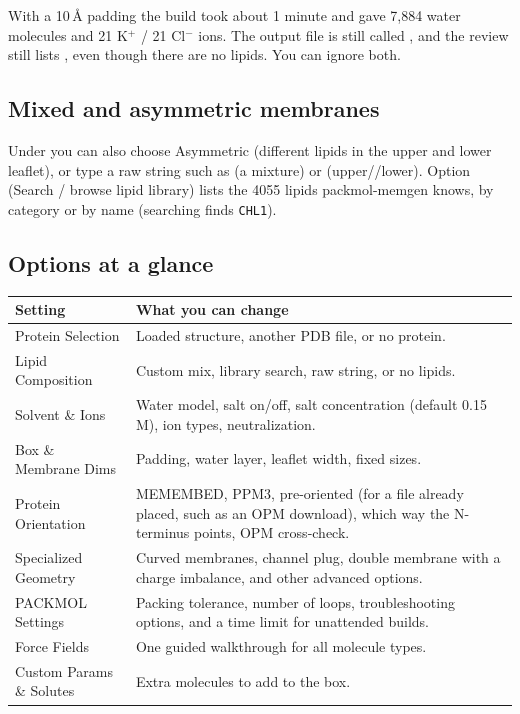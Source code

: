 With a 10\,\AA{} padding the build took about 1 minute and gave 7,884 water
molecules and 21 K$^+$ / 21 Cl$^-$ ions. The output file is still called
, and the review still lists , even
though there are no lipids. You can ignore both.

\subsection{Mixed and asymmetric membranes}

Under  you can also choose \textsf{Asymmetric} (different lipids in the
upper and lower leaflet), or type a raw string such as  (a
mixture) or  (upper//lower). Option 
(\textsf{Search / browse lipid library}) lists the 4055 lipids packmol-memgen
knows, by category or by name (searching  finds
\texttt{CHL1}).

\subsection{Options at a glance}

\begin{tabularx}{\linewidth}{@{}lL@{}}
\toprule
\textbf{Setting} & \textbf{What you can change} \\
\midrule
{} Protein Selection & Loaded structure, another PDB file, or no protein. \\
 Lipid Composition & Custom mix, library search, raw string, or no lipids. \\
 Solvent \& Ions & Water model, salt on/off, salt concentration (default
  0.15\,M), ion types, neutralization. \\
 Box \& Membrane Dims & Padding, water layer, leaflet width, fixed
  sizes. \\
 Protein Orientation & MEMEMBED, PPM3, pre-oriented (for a file
  already placed, such as an OPM download), which way the N-terminus points,
  OPM cross-check. \\
 Specialized Geometry & Curved membranes, channel plug, double
  membrane with a charge imbalance, and other advanced options. \\
 PACKMOL Settings & Packing tolerance, number of loops,
  troubleshooting options, and a time limit for unattended builds. \\
 Force Fields & One guided walkthrough for all molecule types. \\
 Custom Params \& Solutes & Extra molecules to add to the box. \\
\bottomrule
\end{tabularx}

